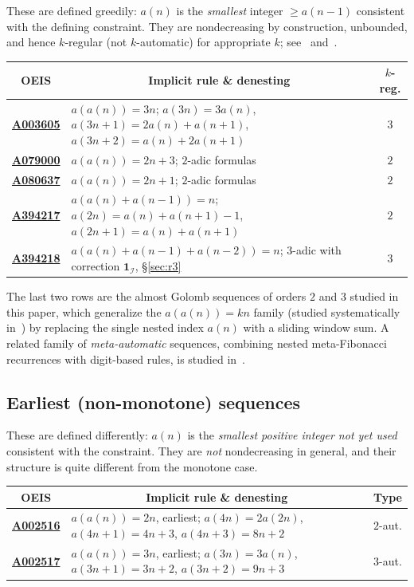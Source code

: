 \documentclass[12pt]{article}
\theoremstyle{definition}
\theoremstyle{remark}
\newcommand{\Ical}{\mathcal{I}}
\newcommand{\one}{\mathbf{1}}
\newcommand{\oeis}[1]{\href{https://oeis.org/#1}{\textbf{#1}}}
\begin{document}
These are defined greedily: $a(n)$ is the \emph{smallest} integer $\ge a(n-1)$
consistent with the defining constraint. They are nondecreasing by construction,
unbounded, and hence $k$-regular (not $k$-automatic) for appropriate $k$;
see~\cite{AS92} and~\cite[Chapter~16]{AS03}.

\medskip
{\small
\begin{center}
\renewcommand{\arraystretch}{1.5}
\begin{tabular}{c|p{9cm}|c}
OEIS & \multicolumn{1}{c|}{Implicit rule \& denesting} & $k$-reg. \\\hline
\oeis{A003605} & $a(a(n))=3n$;\;
  $a(3n)=3a(n)$, $a(3n{+}1)=2a(n){+}a(n{+}1)$,
  $a(3n{+}2)=a(n){+}2a(n{+}1)$ & $3$ \\
\oeis{A079000} & $a(a(n))=2n+3$;\; $2$-adic formulas~\cite{CSV03,ARS05} & $2$ \\
\oeis{A080637} & $a(a(n))=2n+1$;\; $2$-adic formulas~\cite{CSV03,ARS05} & $2$ \\
\oeis{A394217} & $a(a(n){+}a(n{-}1))=n$;\;
  $a(2n)=a(n){+}a(n{+}1){-}1$,\; $a(2n{+}1)=a(n){+}a(n{+}1)$ & $2$ \\
\oeis{A394218} & $a(a(n){+}a(n{-}1){+}a(n{-}2))=n$;\;
  $3$-adic with correction $\one_\Ical$, \S\ref{sec:r3} & $3$ \\
\end{tabular}
\end{center}
}
\medskip

The last two rows are the almost Golomb sequences of orders $2$ and $3$ studied in
this paper, which generalize the $a(a(n))=kn$ family (studied systematically
in~\cite{ARS05}) by replacing the single
nested index $a(n)$ with a sliding window sum.
A related family of \emph{meta-automatic} sequences, combining
nested meta-Fibonacci recurrences with digit-based rules, is studied
in~\cite{CC25}.

\subsection*{Earliest (non-monotone) sequences}

These are defined differently: $a(n)$ is the \emph{smallest positive integer not
yet used} consistent with the constraint. They are \emph{not} nondecreasing in
general, and their structure is quite different from the monotone case.

\medskip
{\small
\begin{center}
\renewcommand{\arraystretch}{1.5}
\begin{tabular}{c|p{9cm}|c}
OEIS & \multicolumn{1}{c|}{Implicit rule \& denesting} & Type \\\hline
\oeis{A002516} & $a(a(n))=2n$, earliest;\;
  $a(4n)=2a(2n)$, $a(4n{+}1)=4n{+}3$, $a(4n{+}3)=8n{+}2$ & $2$-aut. \\
\oeis{A002517} & $a(a(n))=3n$, earliest;\;
  $a(3n)=3a(n)$, $a(3n{+}1)=3n{+}2$, $a(3n{+}2)=9n{+}3$ & $3$-aut. \\
\end{tabular}
\end{center}
}
\medskip
\end{document}

